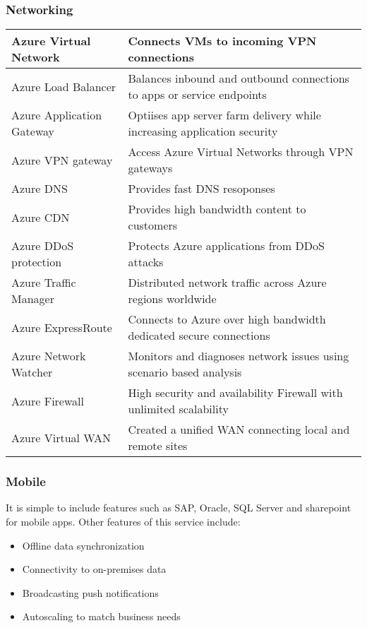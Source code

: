 \documentclass{article}[18pt]
\begin{document}
\subsubsection{Networking}
{\renewcommand{\arraystretch}{2}
	\begin{tabularx}{\textwidth}{X X}
		
		Azure Virtual Network& Connects VMs to incoming VPN connections\\
		\hline
		Azure Load Balancer& Balances inbound and outbound connections to apps or service endpoints\\
		\hline
		Azure Application Gateway&Optiises app server farm delivery while increasing application security\\
		\hline
		Azure VPN gateway& Access Azure Virtual Networks through VPN gateways\\
		\hline
		Azure DNS& Provides fast DNS resoponses\\
		\hline
		Azure CDN&Provides high bandwidth content to customers\\
		\hline
		Azure DDoS protection& Protects Azure applications from DDoS attacks\\
		\hline
		Azure Traffic Manager& Distributed network traffic across Azure regions worldwide\\
		\hline
		Azure ExpressRoute& Connects to Azure over high bandwidth dedicated secure connections\\
		\hline
		Azure Network Watcher& Monitors and diagnoses network issues using scenario based analysis\\
		\hline
		Azure Firewall& High security and availability Firewall with unlimited scalability\\
		\hline
		Azure Virtual WAN& Created a unified WAN connecting local and remote sites
		
		
	\end{tabularx}
}
\subsubsection{Mobile}
It is simple to include features such as SAP, Oracle, SQL Server and sharepoint for mobile apps. Other features of this service include:
\begin{itemize}
	\item Offline data synchronization
	\item Connectivity to on-premises data
	\item Broadcasting push notifications
	\item Autoscaling to match business needs
\end{itemize}
\end{document}
